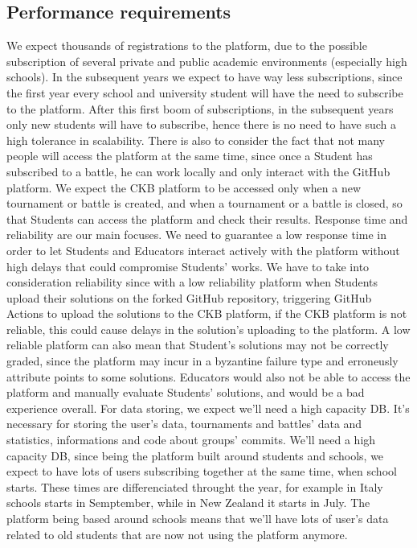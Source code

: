 \documentclass{article}
\begin{document}
{\subsection{Performance requirements}
We expect thousands of registrations to the platform, due to the possible
subscription of several private and public academic environments (especially high schools).
In the subsequent years we expect to have way less subscriptions, since the first year every school and university student
will have the need to subscribe to the platform.
After this first boom of subscriptions, in the subsequent years only new students will have to subscribe, hence there is no need to 
have such a high tolerance in scalability.
There is also to consider the fact that not many people will access the platform at the same time, since once a Student has subscribed 
to a battle, he can work locally and only interact with the GitHub platform.
We expect the CKB platform to be accessed only when a new tournament or battle is created, and when a tournament or a battle is closed,
so that Students can access the platform and check their results. Response time and reliability are our main focuses.
We need to guarantee a low response time in order to let Students and Educators interact actively with the platform
without high delays that could compromise Students' works.
We have to take into consideration reliability since with a low reliability platform when Students upload their solutions on the
forked GitHub repository, triggering GitHub Actions to upload the solutions to the CKB platform, if the CKB platform is not reliable,
this could cause delays in the solution's uploading to the platform.
A low reliable platform can also mean that Student's solutions may not be correctly graded, since the platform may incur in a byzantine failure
type and erroneusly attribute points to some solutions.
Educators would also not be able to access the platform and manually evaluate Students' solutions, and would be a bad experience overall.
For data storing, we expect we'll need a high capacity DB. It's necessary for storing
the user's data, tournaments and battles' data and statistics, informations and code about groups' commits.
We'll need a high capacity DB, since being the platform built around students and schools, we expect to have lots of users subscribing together
at the same time, when school starts. These times are differenciated throught the year, for example in Italy schools starts in Semptember, while in
New Zealand it starts in July. The platform being based around schools means that we'll have lots of user's data related to old students that are
 now not using the platform anymore.
}
\end{document}
